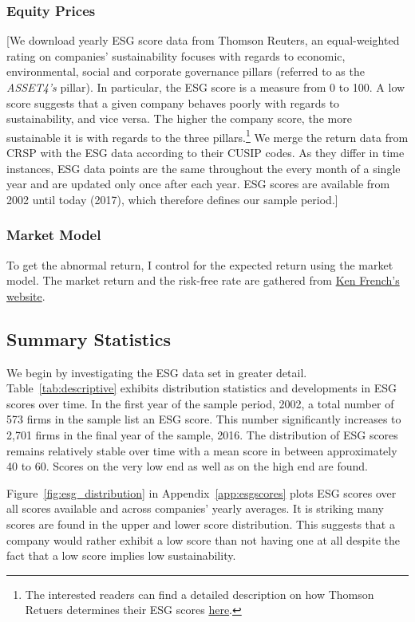\documentclass[11pt]{article}
\begin{document}
\subsubsection*{Equity Prices}
[We download yearly ESG score data from Thomson Reuters, an equal-weighted rating on companies' sustainability focuses with regards to economic, environmental, social and corporate governance pillars (referred to as the \textit{ASSET4's} pillar). In particular, the ESG score is a measure from 0 to 100. A low score suggests that a given company behaves poorly with regards to sustainability, and vice versa. The higher the company score, the more sustainable it is with regards to the three pillars.\footnote{The interested readers can find a detailed description on how Thomson Retuers determines their ESG scores \href{http://www.esade.edu/itemsweb/biblioteca/bbdd/inbbdd/archivos/Thomson_Reuters_ESG_Scores.pdf}{here}.} We merge the return data from CRSP with the ESG data according to their CUSIP codes. As they differ in time instances, ESG data points are the same throughout the every month of a single year and are updated only once after each year. ESG scores are available from 2002 until today (2017), which therefore defines our sample period.]

\subsubsection*{Market Model}
To get the abnormal return, I control for the expected return using the market model. The market return and the risk-free rate are gathered from \href{https://mba.tuck.dartmouth.edu/pages/faculty/ken.french/data_library.html}{Ken French's website}.

\subsection{Summary Statistics}

We begin by investigating the ESG data set in greater detail. Table~\ref{tab:descriptive} exhibits distribution statistics and developments in ESG scores over time. In the first year of the sample period, 2002, a total number of 573 firms in the sample list an ESG score. This number significantly increases to 2,701 firms in the final year of the sample, 2016. The distribution of ESG scores remains relatively stable over time with a mean score in between approximately 40 to 60. Scores on the very low end as well as on the high end are found.

Figure~\ref{fig:esg_distribution} in Appendix~\ref{app:esgscores} plots ESG scores over all scores available and across companies' yearly averages. It is striking many scores are found in the upper and lower score distribution. This suggests that a company would rather exhibit a low score than not having one at all despite the fact that a low score implies low sustainability.
\end{document}
